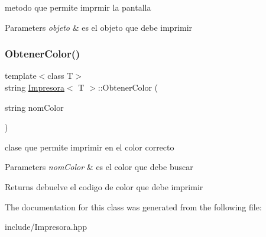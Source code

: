 metodo que permite imprmir la pantalla 


\begin{DoxyParams}{Parameters}
{\em objeto} & es el objeto que debe imprimir \\
\hline
\end{DoxyParams}
\mbox{\label{class_impresora_abab8709ec339f549ef44dae439b33f12}} 
\subsubsection{\texorpdfstring{Obtener\+Color()}{ObtenerColor()}}
{\footnotesize\ttfamily template$<$class T$>$ \\
string \hyperlink{class_impresora}{Impresora}$<$ T $>$\+::Obtener\+Color (\begin{DoxyParamCaption}\item[{string}]{nom\+Color }\end{DoxyParamCaption})\hspace{0.3cm}{\ttfamily [inline]}}



clase que permite imprimir en el color correcto 


\begin{DoxyParams}{Parameters}
{\em nom\+Color} & es el color que debe buscar \\
\hline
\end{DoxyParams}
\begin{DoxyReturn}{Returns}
debuelve el codigo de color que debe imprimir 
\end{DoxyReturn}


The documentation for this class was generated from the following file\+:\begin{DoxyCompactItemize}
\item 
include/Impresora.\+hpp\end{DoxyCompactItemize}
